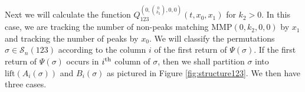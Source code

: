 \documentclass[
final,nomarks
]{dmtcs-episciences}
\newcommand{\fref}[1]{Figure \ref{fig:#1}}
\newcommand{\Sn}[1]{\mathcal{S}_{#1}}
\newcommand{\Qmz}[2]{Q_{123}^{(0,\binom{#1}{#2},0,0)}(t,x_0,x_1)}
\newcommand{\MMP}{\mathrm{MMP}}
\newcommand{\thn}[1]{\begin{math}#1^\textnormal{th}\end{math}}
\begin{document}
Next we will calculate the function \begin{math}\Qmz{0}{k_2}\end{math} for \begin{math}k_2>0\end{math}. 
In this case, we are tracking the number of non-peaks matching \begin{math}\MMP(0,k_2,0,0)\end{math} by \begin{math}x_1\end{math} and tracking the number of peaks by \begin{math}x_0\end{math}. We will classify the permutations \begin{math}\sigma\in\Sn{n}(123)\end{math} 
according to the column \begin{math}i\end{math} of the first return of \begin{math}\Psi(\sigma)\end{math}. If 
the first return of \begin{math}\Psi(\sigma)\end{math} occurs in \thn{i} column of \begin{math}\sigma\end{math}, then 
we shall partition \begin{math}\sigma\end{math} into \begin{math}\mathrm{lift}(A_i(\sigma))\end{math} and \begin{math}B_i(\sigma)\end{math} 
as pictured in \fref{structure123}. We then have three cases. 
\end{document}
